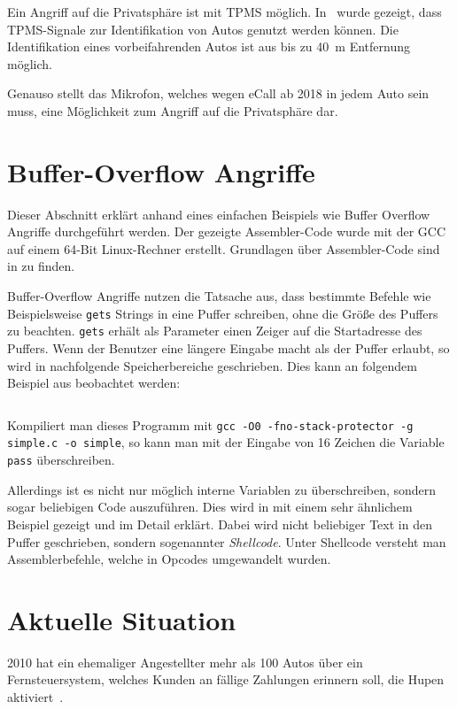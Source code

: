 Ein Angriff auf die Privatsphäre ist mit TPMS möglich. In~\cite{Rouf2010} wurde
gezeigt, dass TPMS-Signale zur Identifikation von Autos genutzt werden können.
Die Identifikation eines vorbeifahrenden Autos ist aus bis zu \SI{40}{\meter}
Entfernung möglich.

Genauso stellt das Mikrofon, welches wegen eCall ab 2018 in jedem Auto sein
muss, eine Möglichkeit zum Angriff auf die Privatsphäre dar.


\section{Buffer-Overflow Angriffe}
Dieser Abschnitt erklärt anhand eines einfachen Beispiels wie Buffer Overflow
Angriffe durchgeführt werden. Der gezeigte Assembler-Code wurde mit der GCC auf
einem 64-Bit Linux-Rechner erstellt. Grundlagen über Assembler-Code sind in
\cite{Albert2012} zu finden.

Buffer-Overflow Angriffe nutzen die Tatsache aus, dass bestimmte Befehle wie
Beispielsweise \verb+gets+ Strings in eine Puffer schreiben, ohne die Größe des
Puffers zu beachten. \verb+gets+ erhält als Parameter einen Zeiger auf die
Startadresse des Puffers. Wenn der Benutzer eine längere Eingabe macht als der
Puffer erlaubt, so wird in nachfolgende Speicherbereiche geschrieben. Dies kann
an folgendem Beispiel aus \cite{Arora2013} beobachtet werden:

\inputminted[linenos, numbersep=5pt, tabsize=4, frame=lines, label=simple.c]{c}{content/exploit-buffer-overflow/simple.c}

Kompiliert man dieses Programm mit
\verb+gcc -O0 -fno-stack-protector -g simple.c -o simple+, so kann man mit der
Eingabe von 16 Zeichen die Variable \verb+pass+ überschreiben.

Allerdings ist es nicht nur möglich interne Variablen zu überschreiben, sondern
sogar beliebigen Code auszuführen. Dies wird in \cite{Mixter} mit einem sehr
ähnlichem Beispiel gezeigt und im Detail erklärt. Dabei wird nicht beliebiger
Text in den Puffer geschrieben, sondern sogenannter \textit{Shellcode}. Unter
Shellcode versteht man Assemblerbefehle, welche in Opcodes umgewandelt wurden.


\section{Aktuelle Situation}
2010 hat ein ehemaliger Angestellter mehr als 100 Autos über ein
Fernsteuersystem, welches Kunden an fällige Zahlungen erinnern soll, die Hupen
aktiviert~\cite{Poulsen2010}.

